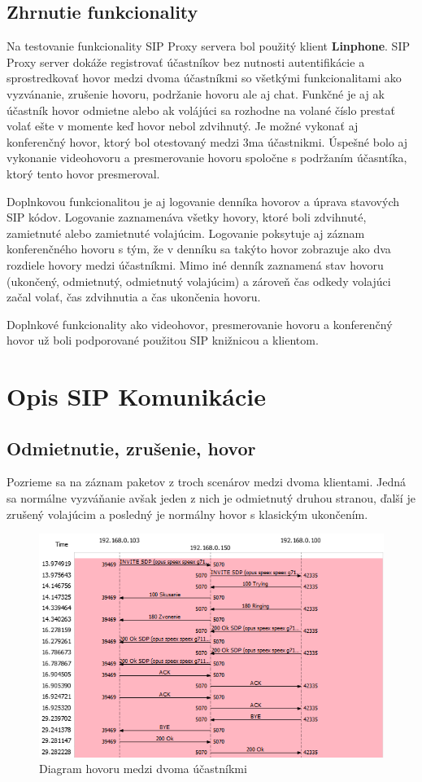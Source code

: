 \documentclass[10pt,oneside,slovak,a4paper]{article}
\begin{document}
\subsection{Zhrnutie funkcionality}
Na testovanie funkcionality SIP Proxy servera bol použitý klient \textbf{Linphone}. SIP Proxy server dokáže registrovať účastníkov bez nutnosti autentifikácie a sprostredkovať hovor medzi dvoma účastníkmi so všetkými funkcionalitami ako vyzvánanie, zrušenie hovoru, podržanie hovoru ale aj chat. Funkčné je aj ak účastník hovor odmietne alebo ak volájúci sa rozhodne na volané číslo prestať volať ešte v momente keď hovor nebol zdvihnutý. Je možné vykonať aj konferenčný hovor, ktorý bol otestovaný medzi 3ma účastnikmi. Úspešné bolo aj vykonanie videohovoru a presmerovanie hovoru spoločne s podržaním účasntíka, ktorý tento hovor presmeroval. 

Doplnkovou funkcionalitou je aj logovanie denníka hovorov a úprava stavových SIP kódov. Logovanie zaznamenáva všetky hovory, ktoré boli zdvihnuté, zamietnuté alebo zamietnuté volajúcim. Logovanie poksytuje aj záznam konferenčného hovoru s tým, že v denníku sa takýto hovor zobrazuje ako dva rozdiele hovory medzi účastníkmi. Mimo iné denník zaznamená stav hovoru (ukončený, odmietnutý, odmietnutý volajúcim) a zároveň čas odkedy volajúci začal volať, čas zdvihnutia a čas ukončenia hovoru.

Doplnkové funkcionality ako videohovor, presmerovanie hovoru a konferenčný hovor už boli podporované použitou SIP knižnicou a klientom.

\section{Opis SIP Komunikácie}
\subsection{Odmietnutie, zrušenie, hovor}
Pozrieme sa na záznam paketov z troch scenárov medzi dvoma klientami. Jedná sa normálne vyzváňanie avšak jeden z nich je odmietnutý druhou stranou, ďalší je zrušený volajúcim a posledný je normálny hovor s klasickým ukončením.

\begin{figure}[H]
	\centering
	\includegraphics[scale=0.8]{Answered.png}
	\caption{Diagram hovoru medzi dvoma účastníkmi}
\end{figure}
\end{document}
